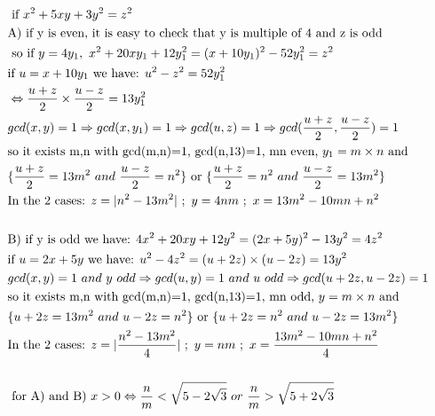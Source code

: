 \documentclass[10pt,a4paper]{letter}
\begin{document}
\begin{align*}
	&\text{ if }x^{2}+5xy+3y^{2}=z^{2}\\
	&\text{A) if y is even, it is easy to check that y is multiple of 4 and z is odd}\\ 
	&\text{ so if }y=4y_{1},\ x^{2}+20xy_{1}+12y_{1}^{2}=(x+10y_{1})^{2} -52y_{1}^{2}=z^{2} \\
	&\text {if }u=x+10y_{1}\text{ we have: }u^{2}-z^{2}=52y_{1}^{2}\\
	&\Leftrightarrow \frac{u+z}{2}\times\frac{u-z}{2}=13y_{1}^{2} \\
	&gcd(x,y)=1 \Rightarrow gcd(x,y_{1})=1 \Rightarrow gcd(u,z)=1 \Rightarrow gcd(\frac{u+z}{2},\frac{u-z}{2})=1 \\
	&\text{so it exists m,n with gcd(m,n)=1, gcd(n,13)=1, mn even, }y_{1}=m\times n\text{ and}\\
	&\{\frac{u+z}{2}=13m^{2}\ and \ \frac{u-z}{2}=n^{2}\}
	\text{ or }\{\frac{u+z}{2}=n^{2}\ and \ \frac{u-z}{2}=13m^{2} \}\\
	&\text{In the 2 cases: }z=\arrowvert n^{2}-13m^{2}\arrowvert \ ; \ y=4nm \ ; \ x=13m^{2}-10mn+n^{2}\\
	& \\
	&\text{B) if y is odd we have: }4x^{2}+20xy+12y^{2}=(2x+5y)^{2}-13y^{2}=4z^{2}\\
	&\text {if }u=2x+5y\text{ we have: }u^{2}-4z^{2}=(u+2z)\times(u-2z)=13y^{2}\\
	&gcd(x,y)=1\ and\ y\ odd \Rightarrow gcd(u,y)=1 \ and\ u\ odd \Rightarrow gcd(u+2z,u-2z)=1\\
	&\text{so it exists m,n with gcd(m,n)=1, gcd(n,13)=1, mn odd, }y=m\times n\text{ and}\\
	&\{{u+2z}=13m^{2}\ and \ {u-2z}=n^{2}\}
	\text{ or }\{{u+2z}=n^{2}\ and \ {u-2z}=13m^{2} \}\\
	&\text{In the 2 cases: }z=\arrowvert \frac{n^{2}-13m^{2}}{4}\arrowvert \ ; \ y=nm \ ; \ x=\frac {13m^{2}-10mn+n^{2}}{4}\\
	& \\
	&\text { for A) and B) }x>0 \Leftrightarrow \frac{n}{m} < \sqrt{5-2\sqrt{3}}\ or \ \frac{n}{m} > \sqrt{5+2\sqrt{3}} \\	
\end{align*}
\end{document}
